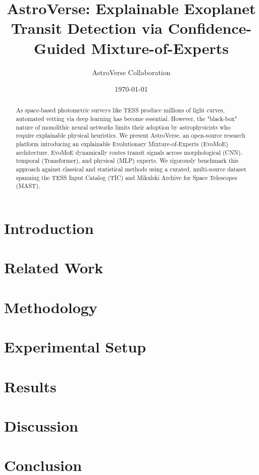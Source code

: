 \documentclass[a4paper,11pt]{article}
\title{AstroVerse: Explainable Exoplanet Transit Detection via Confidence-Guided Mixture-of-Experts}
\author{AstroVerse Collaboration}
\date{\today}
\begin{document}
\maketitle

\begin{abstract}
As space-based photometric surveys like TESS produce millions of light curves, automated vetting via deep learning has become essential. However, the "black-box" nature of monolithic neural networks limits their adoption by astrophysicists who require explainable physical heuristics. We present AstroVerse, an open-source research platform introducing an explainable Evolutionary Mixture-of-Experts (EvoMoE) architecture. EvoMoE dynamically routes transit signals across morphological (CNN), temporal (Transformer), and physical (MLP) experts. We rigorously benchmark this approach against classical and statistical methods using a curated, multi-source dataset spanning the TESS Input Catalog (TIC) and Mikulski Archive for Space Telescopes (MAST).
\end{abstract}

\section{Introduction}

\section{Related Work}

\section{Methodology}

\section{Experimental Setup}

\section{Results}

\section{Discussion}

\section{Conclusion}
\end{document}
